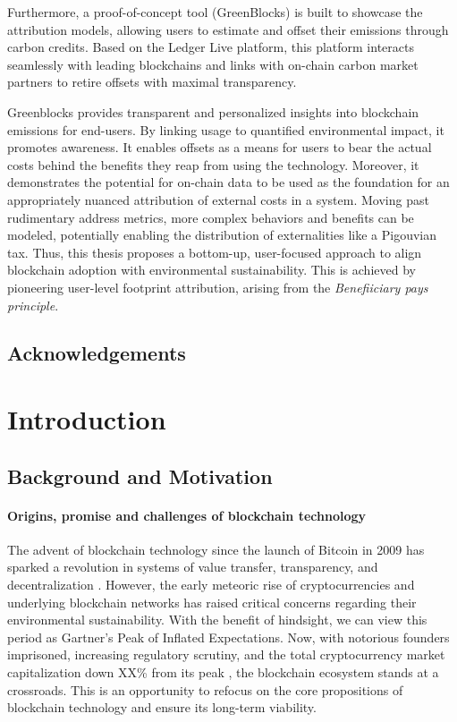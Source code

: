 \documentclass[11pt]{report}
\begin{document}
Furthermore, a proof-of-concept tool (GreenBlocks) is built to showcase the attribution models, allowing users to estimate and offset their emissions through carbon credits. Based on the Ledger Live platform, this platform interacts seamlessly with leading blockchains and links with on-chain carbon market partners to retire offsets with maximal transparency.

Greenblocks provides transparent and personalized insights into blockchain emissions for end-users. By linking usage to quantified environmental impact, it promotes awareness. It enables offsets as a means for users to bear the actual costs behind the benefits they reap from using the technology. Moreover, it demonstrates the potential for on-chain data to be used as the foundation for an appropriately nuanced attribution of external costs in a system. Moving past rudimentary address metrics, more complex behaviors and benefits can be modeled, potentially  enabling the distribution of externalities like a Pigouvian tax. Thus, this thesis proposes a bottom-up, user-focused approach to align blockchain adoption with environmental sustainability. This is achieved by pioneering user-level footprint attribution, arising from the \textit{Benefiiciary pays principle}.



\newpage
\section*{Acknowledgements}
\tableofcontents



\chapter{Introduction}

\section{Background and Motivation}
\subsubsection*{Origins, promise and challenges of blockchain technology}
The advent of blockchain technology since the launch of Bitcoin in 2009 has sparked a revolution in systems of value transfer, transparency, and decentralization \cite{nakamotoBitcoinPeertopeerElectronic2008}. However, the early meteoric rise of cryptocurrencies and underlying blockchain networks has raised critical concerns regarding their environmental sustainability. With the benefit of hindsight, we can view this period as Gartner's Peak of Inflated Expectations. Now, with notorious founders imprisoned, increasing regulatory scrutiny, and the total cryptocurrency market capitalization down
XX\% from its peak , the blockchain ecosystem stands at a crossroads. This is an opportunity to refocus on the core propositions of blockchain technology and ensure its long-term viability.
\end{document}
